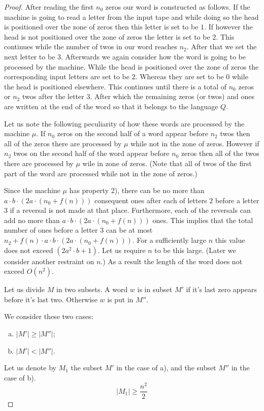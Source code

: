 \documentclass{llncs}
\begin{document}
\begin{proof}
After reading the first $n_0$ zeros our word is constructed as follows. If the machine is going to read a letter from the input tape and while doing so the head is positioned over the zone of zeros then this letter is set to be $1$. %
If however the head is not positioned over the zone of zeros the letter is set to be $2$. This continues while the number of twos in our word reaches $n_2$. After that we set the next letter to be $3$. Afterwards we again consider how the word is going to be processed by the machine. %
While the head is positioned over the zone of zeros the corresponding input letters are set to be $2$. Whereas they are set to be $0$ while the head is positioned elsewhere. This continues until there is a total of $n_0$ zeros or $n_2$ twos after the letter $3$. After which the remaining zeros (or twos) and ones are written at the end of the word so that it belongs to the language $Q$.

Let us note the following peculiarity of how these words are processed by the machine $\mu$. If $n_0$ zeros on the second half of a word appear before $n_2$ twos then all of the zeros there are processed by $\mu$ while not in the zone of zeros. However if $n_2$ twos on the second half of the word appear before $n_0$ zeros then all of the twos there are processed by $\mu$ wile in zone of zeros. (Note that all of twos of the first part of the word are processed while not in the zone of zeros.)

Since the machine $\mu$ has property 2), there can be no more than $a\cdot b\cdot (2a\cdot (n_0+f(n)))$ consequent ones after each of letters $2$ before a letter $3$ if a reversal is not made at that place. Furthermore, each of the reversals can add no more than $a\cdot b\cdot (2a\cdot (n_0+f(n)))$ ones. This implies that the total number of ones before a letter $3$ can be at most $n_2+f(n)\cdot a\cdot b\cdot (2a\cdot (n_0+f(n)))$. For a sufficiently large $n$ this value does not exceed $(2a^2\cdot b+1)$. Let us require $n$ to be this large. (Later we consider another restraint on $n$.) As a result the length of the word does not exceed $O(n^2)$.

Let us divide $M$ in two subsets. A word $w$ is in subset $M'$ if it's last zero appears before it's last two. Otherwise $w$ is put in $M''$.

We consider these two cases:
\begin{enumerate}[a)]
\item $|M'| \geq |M''|$;
\item $|M'| < |M''|$.
\end{enumerate}
Let us denote by $M_1$ the subset $M'$ in the case of a), and the subset $M''$ in the case of b). $$|M_1|\geq \frac{n^2}{2}$$


\end{proof}
\end{document}
